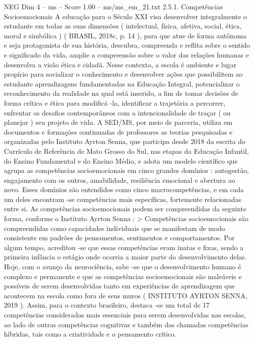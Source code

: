 \begin{textsample}{NEG Dim 4 – ms – Score 1.00 – ms/ms\_em\_21.txt}  \label{ex:f4_neg_139}
2.5.1.
Competências Socioemocionais A educação para o Século XXI visa desenvolver integralmente o estudante em todas as suas dimensões ( intelectual, física, afetiva, social, ética, moral e simbólica ) ( BRASIL, 2018c, p. 14 ), para que atue de forma autônoma e seja protagonista de sua história, descubra, compreenda e reflita sobre o sentido e significado da vida, amplie a compreensão sobre o valor das relações humanas e desenvolva a visão ética e cidadã.
Nesse contexto, a escola é ambiente e lugar propício para socializar o conhecimento e desenvolver ações que possibilitem ao estudante aprendizagens fundamentadas na Educação Integral, potencializar o reconhecimento da realidade na qual está inserido, a fim de tomar decisões de forma crítica e ética para modificá -la, identificar a trajetória a percorrer, enfrentar os desafios contemporâneos com a intencionalidade de traçar ( ou planejar ) seu projeto de vida.
A SED/MS, por meio de parceria, utiliza em documentos e formações continuadas de professores as teorias pesquisadas e organizadas pelo Instituto Ayrton Senna, que participa desde 2018 da escrita do Currículo de Referência de Mato Grosso do Sul, nas etapas da Educação Infantil, do Ensino Fundamental e do Ensino Médio, e adota um modelo científico que agrupa as competências socioemocionais em cinco grandes domínios : autogestão, engajamento com os outros, amabilidade, resiliência emocional e abertura ao novo.
Esses domínios são entendidos como cinco macrocompetências, e em cada um deles encontram -se competências mais específicas, fortemente relacionadas entre si.
As competências socioemocionais podem ser compreendidas da seguinte forma, conforme o Instituto Ayrton Senna : > Competências socioemocionais são compreendidas como capacidades individuais que se manifestam de modo consistente em padrões de pensamentos, sentimentos e comportamentos.
Por algum tempo, acreditou -se que essas competências eram inatas e fixas, sendo a primeira infância o estágio onde ocorria a maior parte do desenvolvimento delas.
Hoje, com o avanço da neurociência, sabe -se que o desenvolvimento humano é complexo e permanente e que as competências socioemocionais são maleáveis e possíveis de serem desenvolvidas tanto em experiências de aprendizagem que acontecem na escola como fora de seus muros ( INSTITUTO AYRTON SENNA, 2019 ).
Assim, para o contexto brasileiro, destaca -se um total de 17 competências consideradas mais essenciais para serem desenvolvidas nas escolas, ao lado de outras competências cognitivas e também das chamadas competências híbridas, tais como a criatividade e o pensamento crítico.

\end{textsample}

